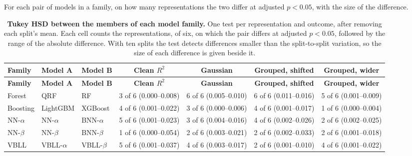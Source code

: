 \begin{landscape}
\label{app:noise:sec:tukey_within_families}
For each pair of models in a family, on how many representations the two differ at adjusted $p < 0.05$, with the size of the difference.
{\AFtablefont
\begin{longtable}{lllcccc}
\caption{\textbf{Tukey HSD between the members of each model family.}
One test per representation and outcome, after removing each split's mean. Each cell counts the representations, of six, on which the pair differs at adjusted $p < 0.05$, followed by the range of the absolute difference. With ten splits the test detects differences smaller than the split-to-split variation, so the size of each difference is given beside it.}
\label{app:noise:family_tukey}\\
\toprule
\textbf{Family} & \textbf{Model A} & \textbf{Model B} & \textbf{Clean $R^2$} & \textbf{Gaussian} & \textbf{Grouped, shifted} & \textbf{Grouped, wider} \\
\midrule
\endfirsthead
\toprule
\textbf{Family} & \textbf{Model A} & \textbf{Model B} & \textbf{Clean $R^2$} & \textbf{Gaussian} & \textbf{Grouped, shifted} & \textbf{Grouped, wider} \\
\midrule
\endhead
Forest & QRF & RF & 3 of 6 (0.000--0.008) & 6 of 6 (0.005--0.010) & 6 of 6 (0.011--0.016) & 5 of 6 (0.001--0.009) \\
Boosting & LightGBM & XGBoost & 4 of 6 (0.001--0.022) & 3 of 6 (0.000--0.006) & 4 of 6 (0.001--0.017) & 1 of 6 (0.000--0.004) \\
NN-$\alpha$ & NN-$\alpha$ & BNN-$\alpha$ & 5 of 6 (0.001--0.023) & 3 of 6 (0.004--0.016) & 4 of 6 (0.002--0.026) & 2 of 6 (0.002--0.025) \\
NN-$\beta$ & NN-$\beta$ & BNN-$\beta$ & 1 of 6 (0.000--0.054) & 2 of 6 (0.003--0.021) & 2 of 6 (0.002--0.033) & 2 of 6 (0.001--0.018) \\
VBLL & VBLL-$\alpha$ & VBLL-$\beta$ & 5 of 6 (0.001--0.037) & 4 of 6 (0.003--0.017) & 2 of 6 (0.001--0.010) & 4 of 6 (0.001--0.022) \\
\bottomrule
\end{longtable}}


\end{landscape}
